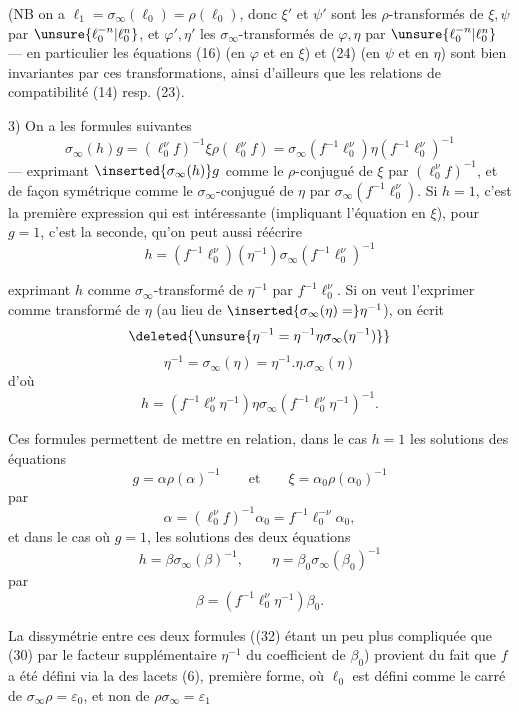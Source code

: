 (NB on a $\ell_1=\sigma_\infty(\ell_0)=\rho(\ell_0)$, donc $\xi'$ et $\psi'$ sont les $\rho$-transformés de $\xi,\psi$ par $\unsure{\ell_0^{-n}|\ell_0^n}$, et $\varphi',\eta'$ les $\sigma_\infty$-transformés de $\varphi,\eta$ par $\unsure{\ell_0^{-n}|\ell_0^n}$ --- en particulier les équations (16) (en $\varphi$ et en $\xi$) et (24) (en $\psi$ et en $\eta$) sont bien invariantes par ces transformations, ainsi d'ailleurs que les relations de compatibilité (14) resp. (23).

3) On a les formules suivantes 
\[
 \sigma_\infty(h)g
 = (\ell_0^\nu f)^{-1}\xi\rho(\ell_0^\nu f)
 = \sigma_\infty(f^{-1}\ell_0^\nu)\eta(f^{-1}\ell_0^\nu)^{-1}
 \tag{27}
\]
 --- exprimant $\inserted{\sigma_\infty(h)}g$ comme le $\rho$-conjugué de $\xi$ par $(\ell_0^\nu f)^{-1}$, et de façon symétrique  comme le $\sigma_\infty$-conjugué de $\eta$ par $\sigma_\infty(f^{-1}\ell_0^\nu)$. Si $h=1$, c'est la première expression qui est intéressante (impliquant l'équation en $\xi$), pour $g=1$, c'est la seconde, qu'on peut aussi réécrire 
\[
 h=(f^{-1}\ell_0^\nu)(\eta^{-1})\sigma_\infty(f^{-1}\ell_0^\nu)^{-1}
 \tag{28}
\]


exprimant $h$ comme $\sigma_\infty$-transformé de $\eta^{-1}$ par $f^{-1}\ell_0^\nu$. Si on veut l'exprimer comme \inserted{$\sigma_\infty$-}transformé de $\eta$ (au lieu de $\inserted{\sigma_\infty(\eta)=}\eta^{-1}$), on écrit
\[
 \deleted{\unsure{\eta^{-1}=\eta^{-1}\eta\sigma_\infty(\eta^{-1})}}
\]
\[
 \eta^{-1}=\sigma_\infty(\eta)=\eta^{-1}.\eta.\sigma_\infty(\eta)
\]
d'où
\[
 h=(f^{-1}\ell_0^\nu\eta^{-1})\eta\sigma_\infty(f^{-1}\ell_0^\nu\eta^{-1})^{-1}.
 \tag{28bis}
\]

Ces formules permettent de mettre en relation, dans le cas $h=1$ les solutions des  équations
\[
 g=\alpha\rho(\alpha)^{-1}
 \qquad\text{et}\qquad
 \xi=\alpha_0\rho(\alpha_0)^{-1}
 \tag{29}
\]
par
\[
 \alpha=(\ell_0^\nu f)^{-1}\alpha_0=f^{-1}\ell_0^{-\nu}\alpha_0,
 \tag{30}
\]
et dans le cas où $g=1$, les solutions des deux équations
\[
 h=\beta\sigma_\infty(\beta)^{-1},\qquad
 \eta=\beta_0\sigma_\infty(\beta_0)^{-1}
 \tag{31}
\]
par
\[
 \beta=(f^{-1}\ell_0^\nu\eta^{-1})\beta_0.
 \tag{32}
\]

La dissymétrie entre ces deux formules ((32) étant un peu plus compliquée que (30) par le facteur supplémentaire $\eta^{-1}$ du coefficient de $\beta_0$) provient du fait que $f$ a été défini via la  des lacets (6), première forme, où $\ell_0$ est défini comme le carré de $\sigma_\infty\rho=\varepsilon_0$, et non de $\rho\sigma_\infty=\varepsilon_1$

